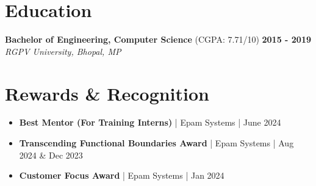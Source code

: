 \documentclass[10pt, a4paper]{article}
\begin{document}
\section{Education}
\noindent\textbf{Bachelor of Engineering, Computer Science} (CGPA: 7.71/10) \hfill \textbf{2015 - 2019} \\
\textit{RGPV University, Bhopal, MP}

\section{Rewards \& Recognition}
\begin{itemize}[leftmargin=*, nosep, itemsep=0.5ex]
    \item \small \textbf{Best Mentor (For Training Interns)} | Epam Systems | June 2024
    \item \small \textbf{Transcending Functional Boundaries Award} | Epam Systems | Aug 2024 \& Dec 2023
    \item \small \textbf{Customer Focus Award} | Epam Systems | Jan 2024
\end{itemize}
\end{document}
